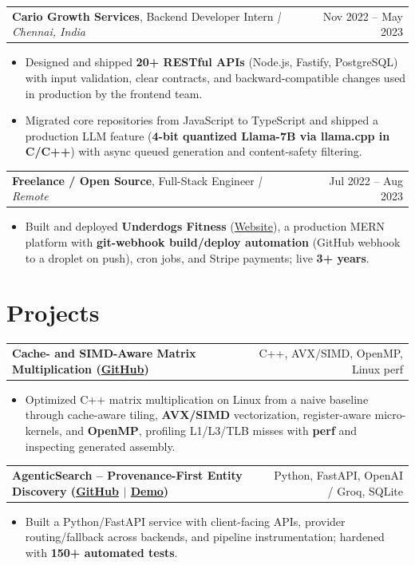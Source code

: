 \documentclass[letterpaper,11pt]{article}
\makeatletter
\newcommand{\expItem}[4]{%
  \vspace{3pt}
  \begin{tabular*}{\textwidth}{@{}l@{\extracolsep{\fill}}r@{}}
    \textbf{#1}, #2 \textit{| #3} & #4 \\
  \end{tabular*}\par\vspace{-2pt}
}
\newcommand{\projItem}[2]{%
  \vspace{6pt}
  \begin{tabular*}{\textwidth}{@{}l@{\extracolsep{\fill}}r@{}}
    \textbf{#1} & #2 \\
  \end{tabular*}\par\vspace{-2pt}
}
\makeatother
\begin{document}
\expItem{Cario Growth Services}{Backend Developer Intern}{Chennai, India}{Nov 2022 -- May 2023}
\begin{itemize}
  \item Designed and shipped \textbf{20+ RESTful APIs} (Node.js, Fastify, PostgreSQL) with input validation, clear contracts, and backward-compatible changes used in production by the frontend team.
  \item Migrated core repositories from JavaScript to TypeScript and shipped a production LLM feature (\textbf{4-bit quantized Llama-7B via llama.cpp in C/C++}) with async queued generation and content-safety filtering.
\end{itemize}

\expItem{Freelance / Open Source}{Full-Stack Engineer}{Remote}{Jul 2022 -- Aug 2023}
\begin{itemize}
  \item Built and deployed \textbf{Underdogs Fitness} (\href{https://www.underdogsfitness.in/}{Website}), a production MERN platform with \textbf{git-webhook build/deploy automation} (GitHub webhook to a droplet on push), cron jobs, and Stripe payments; live \textbf{3+ years}.
\end{itemize}

\section{Projects}

\projItem{Cache- and SIMD-Aware Matrix Multiplication {\normalfont\small(\href{https://github.com/Deva-1903/cs690pf}{GitHub})}}{C++, AVX/SIMD, OpenMP, Linux perf}
\begin{itemize}
  \item Optimized C++ matrix multiplication on Linux from a naive baseline through cache-aware tiling, \textbf{AVX/SIMD} vectorization, register-aware micro-kernels, and \textbf{OpenMP}, profiling L1/L3/TLB misses with \textbf{perf} and inspecting generated assembly.
\end{itemize}

\projItem{AgenticSearch -- Provenance-First Entity Discovery {\normalfont\small(\href{https://github.com/Deva-1903/ciir_agentic_search}{GitHub} $\vert$ \href{https://agentic-search-negglszkwa-uc.a.run.app}{Demo})}}{Python, FastAPI, OpenAI / Groq, SQLite}
\begin{itemize}
  \item Built a Python/FastAPI service with client-facing APIs, provider routing/fallback across backends, and pipeline instrumentation; hardened with \textbf{150+ automated tests}.
\end{itemize}
\end{document}
